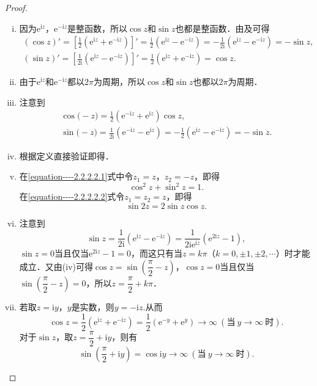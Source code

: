 \documentclass[../../main.tex]{subfiles}
\begin{document}
\begin{proof}
\begin{enumerate}[(i)]
\item 因为$\text{e}^{\text{i}z}$，$\text{e}^{-\text{i}z}$是整函数，所以$\cos z$和$\sin z$也都是整函数．由及可得
\begin{gather*}
(\cos z)' =\left[ \frac{1}{2}\left( \mathrm{e}^{\mathrm{i}z}+\mathrm{e}^{-\mathrm{i}z} \right) \right] ' =\frac{\mathrm{i}}{2}\left( \mathrm{e}^{\mathrm{i}z}-\mathrm{e}^{-\mathrm{i}z} \right) =-\frac{1}{2\mathrm{i}}\left( \mathrm{e}^{\mathrm{i}z}-\mathrm{e}^{-\mathrm{i}z} \right) =-\sin z,
\\
(\sin z)' =\left[ \frac{1}{2\mathrm{i}}\left( \mathrm{e}^{\mathrm{i}z}-\mathrm{e}^{-\mathrm{i}z} \right) \right]'=\frac{1}{2}\left( \mathrm{e}^{\mathrm{i}z}+\mathrm{e}^{-\mathrm{i}z} \right) =\cos z.
\end{gather*}

\item 由于$\text{e}^{\text{i}z}$和$\text{e}^{-\text{i}z}$都以$2\pi$为周期，所以$\cos z$和$\sin z$也都以$2\pi$为周期．

\item 注意到
\begin{gather*}
\cos\mathrm{(}-z)=\frac{1}{2}\left( \mathrm{e}^{-\mathrm{i}z}+\mathrm{e}^{\mathrm{i}z} \right) \cos z,
\\
\sin\mathrm{(}-z)=\frac{1}{2\mathrm{i}}\left( \mathrm{e}^{-\mathrm{i}z}-\mathrm{e}^{\mathrm{i}z} \right) =-\frac{1}{2}\left( \mathrm{e}^{\mathrm{i}z}-\mathrm{e}^{-\mathrm{i}z} \right) =-\sin z.
\end{gather*}

\item 根据定义直接验证即得．

\item 在\eqref{equation----2.2.2.2.1}式中令$z_1 = z$，$z_2 = -z$，即得
\[
\cos^2 z + \sin^2 z = 1.
\]
在\eqref{equation----2.2.2.2.2}式令$z_1 = z_2 = z$，即得
\[
\sin 2z = 2\sin z \cos z.
\]

\item 注意到
\[
\sin z = \dfrac{1}{2\text{i}}(\text{e}^{\text{i}z} - \text{e}^{-\text{i}z})
= \dfrac{1}{2\text{i}\text{e}^{\text{i}z}}(\text{e}^{2\text{i}z} - 1),
\]
$\sin z = 0$当且仅当$\text{e}^{2\text{i}z} - 1 = 0$，而这只有当$z = k\pi$（$k = 0, \pm 1, \pm 2, \cdots$）时才能成立．又由(iv)可得$\cos z = \sin\left( \dfrac{\pi}{2} - z \right)$，$\cos z = 0$当且仅当$\sin\left( \dfrac{\pi}{2} - z \right) = 0$，所以$z = \dfrac{\pi}{2} + k\pi$．

\item 若取$z = \text{i}y$，$y$是实数，则$y=-\text{i}z$.从而
\[
\cos z = \dfrac{1}{2}(\text{e}^{\text{i}z} + \text{e}^{-\text{i}z})
= \dfrac{1}{2}(\text{e}^{-y} + \text{e}^y)
\rightarrow \infty \ (\text{当} \ y \rightarrow \infty \ \text{时}).
\]
对于$\sin z$，取$z = \dfrac{\pi}{2} + \text{i}y$，则有
\[
\sin\left( \dfrac{\pi}{2} + \text{i}y \right) = \cos \text{i}y \rightarrow \infty \ (\text{当} \ y \rightarrow \infty \ \text{时}).
\]
\end{enumerate}
\end{proof}
\end{document}
